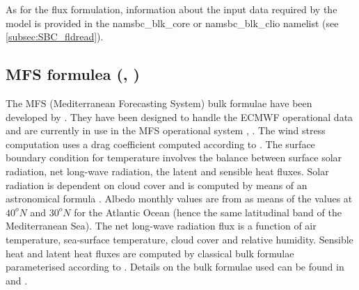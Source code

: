 \documentclass[../tex_main/NEMO_manual]{subfiles}
\begin{document}
As for the flux formulation, information about the input data required by the model is provided in
the namsbc\_blk\_core or namsbc\_blk\_clio namelist (see \autoref{subsec:SBC_fldread}). 

\subsection{MFS formulea (\protect{}, \protect{})}
\label{subsec:SBC_blk_mfs}
%

The MFS (Mediterranean Forecasting System) bulk formulae have been developed by \citet{Castellari_al_JMS1998}. 
They have been designed to handle the ECMWF operational data and are currently in use in
the MFS operational system \citep{Tonani_al_OS08}, \citep{Oddo_al_OS09}.
The wind stress computation uses a drag coefficient computed according to \citet{Hellerman_Rosenstein_JPO83}.
The surface boundary condition for temperature involves the balance between
surface solar radiation, net long-wave radiation, the latent and sensible heat fluxes.
Solar radiation is dependent on cloud cover and is computed by means of an astronomical formula \citep{Reed_JPO77}.
Albedo monthly values are from \citet{Payne_JAS72} as means of the values at $40^{o}N$ and $30^{o}N$ for
the Atlantic Ocean (hence the same latitudinal band of the Mediterranean Sea).
The net long-wave radiation flux \citep{Bignami_al_JGR95} is a function of
air temperature, sea-surface temperature, cloud cover and relative humidity.
Sensible heat and latent heat fluxes are computed by classical bulk formulae parameterised according to
\citet{Kondo1975}.
Details on the bulk formulae used can be found in \citet{Maggiore_al_PCE98} and \citet{Castellari_al_JMS1998}.
\end{document}
